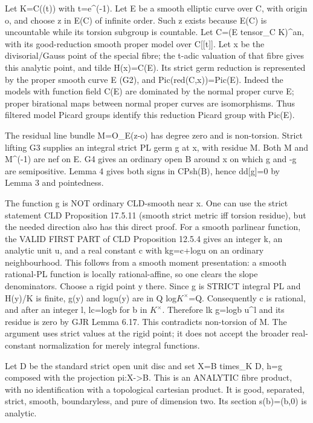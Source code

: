 \documentclass[
  11pt,
]{article}
\begin{document}
Let K=C((t)) with \textbar t\textbar=e\^{}(-1). Let E be a smooth
elliptic curve over C, with origin o, and choose z in E(C) of infinite
order. Such z exists because E(C) is uncountable while its torsion
subgroup is countable. Let C=(E tensor\_C K)\^{}an, with its
good-reduction smooth proper model over C{[}{[}t{]}{]}. Let x be the
divisorial/Gauss point of the special fibre; the t-adic valuation of
that fibre gives this analytic point, and tilde H(x)=C(E). Its strict
germ reduction is represented by the proper smooth curve E (G2), and
Pic(red(C,x))=Pic(E). Indeed the models with function field C(E) are
dominated by the normal proper curve E; proper birational maps between
normal proper curves are isomorphisms. Thus filtered model Picard groups
identify this reduction Picard group with Pic(E).

The residual line bundle M=O\_E(z-o) has degree zero and is non-torsion.
Strict lifting G3 supplies an integral strict PL germ g at x, with
residue M. Both M and M\^{}(-1) are nef on E. G4 gives an ordinary open
B around x on which g and -g are semipositive. Lemma 4 gives both signs
in CPsh(B), hence dd{[}g{]}=0 by Lemma 3 and pointedness.

The function g is NOT ordinary CLD-smooth near x. One can use the strict
statement CLD Proposition 17.5.11 (smooth strict metric iff torsion
residue), but the needed direction also has this direct proof. For a
smooth parlinear function, the VALID FIRST PART of CLD Proposition
12.5.4 gives an integer k, an analytic unit u, and a real constant c
with kg=c+log\textbar u\textbar{} on an ordinary neighbourhood. This
follows from a smooth moment presentation: a smooth rational-PL function
is locally rational-affine, so one clears the slope denominators. Choose
a rigid point y there. Since g is STRICT integral PL and H(y)/K is
finite, g(y) and log\textbar u(y)\textbar{} are in Q
log\textbar{}\(K^\times\)\textbar=Q. Consequently c is rational, and
after an integer l, lc=log\textbar b\textbar{} for b in \(K^\times\).
Therefore lk g=log\textbar b u\^{}l\textbar{} and its residue is zero by
GJR Lemma 6.17. This contradicts non-torsion of M. The argument uses
strict values at the rigid point; it does not accept the broader
real-constant normalization for merely integral functions.

Let D be the standard strict open unit disc and set X=B times\_K D, h=g
composed with the projection pi:X-\textgreater B. This is an ANALYTIC
fibre product, with no identification with a topological cartesian
product. It is good, separated, strict, smooth, boundaryless, and pure
of dimension two. Its section s(b)=(b,0) is analytic.
\end{document}
